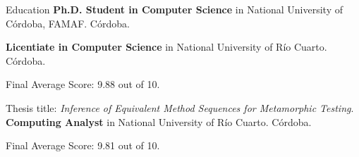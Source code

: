 \begin{rubric}{Education}
\entry*[2024--Present]%
	\textbf{Ph.D. Student in Computer Science} in National University of Córdoba, FAMAF. Córdoba.\par
%
\entry*[2019--2024]%
	\textbf{Licentiate in Computer Science} in National University of Río Cuarto. Córdoba.\par
	Final Average Score: 9.88 out of 10.\par
	Thesis title: \emph{Inference of Equivalent Method Sequences for Metamorphic Testing}.
% 
\entry*[2019--2021]%
	\textbf{Computing Analyst} in National University of Río Cuarto. Córdoba.\par
	Final Average Score: 9.81 out of 10.

\end{rubric}